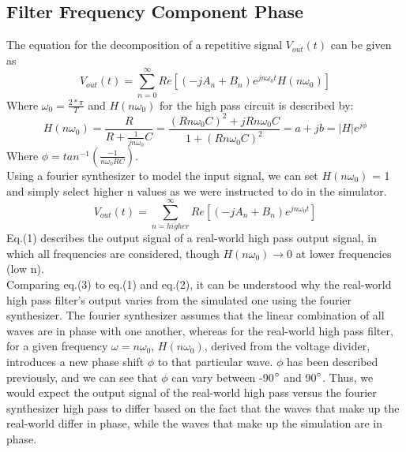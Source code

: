 \documentclass{article}
\begin{document}
\subsection{Filter Frequency Component Phase}
    The equation for the decomposition of a repetitive signal $V_{out}(t)$ can be given as
    \begin{equation}
        V_{out}(t) = \sum\limits_{n=0}^\infty Re[(-jA_n+B_n)e^{jn\omega_0 t}H(n\omega_0)]
    \end{equation}
    Where $\omega_0 = \frac{2*\pi}{T}$ and $H(n\omega_0)$ for the high pass circuit is described by:
    \begin{equation}
        H(n\omega_0) = \frac{R}{R+\frac{1}{jn\omega_0}C} = \frac{(Rn\omega_0 C)^{2} + jRn\omega_0 C}{1 + (Rn\omega_0 C)^{2}} = a + jb = |H|e^{j\phi}
    \end{equation}
    Where $\phi = tan^{-1}(\frac{-1}{n\omega_0 RC})$.\\
    Using a fourier synthesizer to model the input signal, we can set $H(n\omega_0)$ = 1 and simply select higher n values as we were instructed to do in the simulator.
    \begin{equation}
        V_{out}(t) = \sum\limits_{n=higher}^\infty Re[(-jA_n+B_n)e^{jn\omega_0 t}]
    \end{equation}
    Eq.(1) describes the output signal of a real-world high pass output signal, in which all frequencies are considered, though $H(n\omega_0) \rightarrow 0$ at lower frequencies (low n).\\ 
    \indent Comparing eq.(3) to eq.(1) and eq.(2), it can be understood why the real-world high pass filter's output varies from the simulated one using the fourier synthesizer. The fourier synthesizer assumes that the linear combination of all waves are in phase with one another, whereas for the real-world high pass filter, for a given frequency $\omega = n\omega_0$, $H(n\omega_0)$, derived from the voltage divider, introduces a new phase shift $\phi$ to that particular wave. $\phi$ has been described previously, and we can see that $\phi$ can vary between -90$\degree$ and 90$\degree$. Thus, we would expect the output signal of the real-world high pass versus the fourier synthesizer high pass to differ based on the fact that the waves that make up the real-world differ in phase, while the waves that make up the simulation are in phase.
\end{document}
